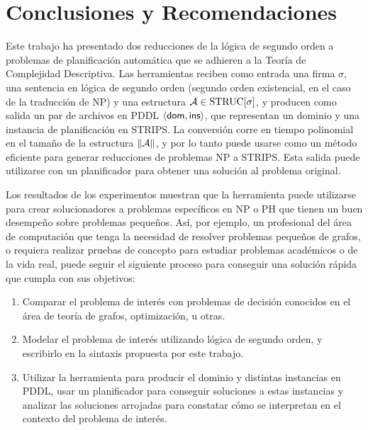 \chapter{Conclusiones y Recomendaciones}
\label{Capitulo5}

Este trabajo ha presentado dos reducciones de la lógica de segundo orden a
problemas de planificación automática que se adhieren a la Teoría de
Complejidad Descriptiva. Las herramientas reciben como entrada una firma
$\sigma$, una sentencia en lógica de segundo orden (segundo orden existencial,
en el caso de la traducción de NP) y una estructura $\mathcal{A}\in\text{STRUC}[\sigma]$, y
producen como salida un par de archivos en PDDL $\langle \mathsf{dom},\mathsf{ins} \rangle$, que
representan un dominio y una instancia de planificación en STRIPS. La
conversión corre en tiempo polinomial en el tamaño de la estructura $\|\mathcal{A}\|$, y
por lo tanto puede usarse como un método eficiente para generar reducciones de
problemas NP a STRIPS. Esta salida puede utilizarse con un planificador 
para obtener una solución al problema original.

Los resultados de los experimentos muestran que la herramienta puede utilizarse
para crear solucionadores a problemas específicos en NP o PH que tienen un buen desempeño
sobre problemas pequeños. Así, por ejemplo, un profesional del área de
computación que tenga la necesidad de resolver problemas pequeños de grafos, o
requiera realizar pruebas de concepto para estudiar problemas académicos o de la vida
real, puede seguir el siguiente proceso para conseguir una solución rápida que
cumpla con sus objetivos:
\begin{enumerate}
\item Comparar el problema de interés con problemas de decisión conocidos en el
área de teoría de grafos, optimización, u otras.
\item Modelar el problema de interés utilizando lógica de segundo orden, y
escribirlo en la sintaxis propuesta por este trabajo.
\item Utilizar la herramienta para producir el dominio y distintas instancias
en PDDL, usar un planificador para conseguir soluciones a estas instancias y
analizar las soluciones arrojadas para constatar cómo se interpretan en el contexto del
problema de interés.
\end{enumerate}

